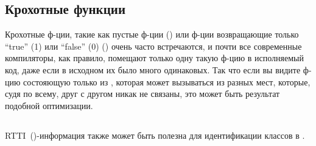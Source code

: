 \subsection{Крохотные функции}

Крохотные ф-ции, такие как пустые ф-ции ()
или ф-ции возвращающие только ``true'' (1) или ``false'' (0) () очень часто встречаются,
и почти все современные компиляторы, как правило, помещают только одну такую ф-цию в исполняемый код,
даже если в исходном их было много одинаковых.
Так что если вы видите ф-цию состояющую только из , которая может вызываться из разных мест,
которые, судя по всему, друг с другом никак не связаны, это может быть результат подобной оптимизации.

\subsection{\Cpp}

\ac{RTTI}~()-информация также может быть полезна для идентификации 
классов в \Cpp.


